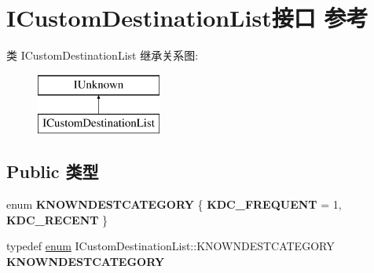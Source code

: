\hypertarget{interface_i_custom_destination_list}{}\section{I\+Custom\+Destination\+List接口 参考}
\label{interface_i_custom_destination_list}
类 I\+Custom\+Destination\+List 继承关系图\+:\begin{figure}[H]
\begin{center}
\leavevmode
\includegraphics[height=2.000000cm]{interface_i_custom_destination_list}
\end{center}
\end{figure}
\subsection*{Public 类型}
\begin{DoxyCompactItemize}
\item 
\mbox{\label{interface_i_custom_destination_list_ad05f33d8f53955a833029ba7165b4f9b}} 
enum {\bfseries K\+N\+O\+W\+N\+D\+E\+S\+T\+C\+A\+T\+E\+G\+O\+RY} \{ {\bfseries K\+D\+C\+\_\+\+F\+R\+E\+Q\+U\+E\+NT} = 1, 
{\bfseries K\+D\+C\+\_\+\+R\+E\+C\+E\+NT}
 \}
\item 
\mbox{\label{interface_i_custom_destination_list_a45b7b2d33d8b67e5bb5d5ac54a3bcd11}} 
typedef \hyperlink{interfaceenum}{enum} I\+Custom\+Destination\+List\+::\+K\+N\+O\+W\+N\+D\+E\+S\+T\+C\+A\+T\+E\+G\+O\+RY {\bfseries K\+N\+O\+W\+N\+D\+E\+S\+T\+C\+A\+T\+E\+G\+O\+RY}
\end{DoxyCompactItemize}
